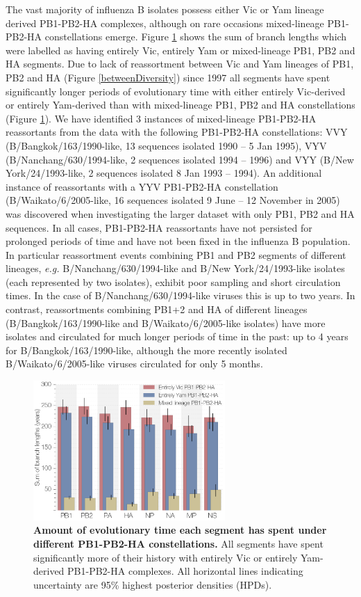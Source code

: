 \documentclass[11pt,oneside,letterpaper]{article}
\begin{document}
The vast majority of influenza B isolates possess either Vic or Yam lineage derived PB1-PB2-HA complexes, although on rare occasions mixed-lineage PB1-PB2-HA constellations emerge.
Figure \ref{stateTime} shows the sum of branch lengths which were labelled as having entirely Vic, entirely Yam or mixed-lineage PB1, PB2 and HA segments.
Due to lack of reassortment between Vic and Yam lineages of PB1, PB2 and HA (Figure \ref{betweenDiversity}) since 1997 all segments have spent significantly longer periods of evolutionary time with either entirely Vic-derived or entirely Yam-derived than with mixed-lineage PB1, PB2 and HA constellations (Figure \ref{stateTime}).
We have identified 3 instances of mixed-lineage PB1-PB2-HA reassortants from the data with the following PB1-PB2-HA constellations: VVY (B/Bangkok/163/1990-like, 13 sequences isolated 1990 -- 5 Jan 1995), VYV (B/Nanchang/630/1994-like, 2 sequences isolated 1994 -- 1996) and VYY (B/New York/24/1993-like, 2 sequences isolated 8 Jan 1993 -- 1994).
An additional instance of reassortants with a YYV PB1-PB2-HA constellation (B/Waikato/6/2005-like, 16 sequences isolated 9 June -- 12 November in 2005) was discovered when investigating the larger dataset with only PB1, PB2 and HA sequences.
In all cases, PB1-PB2-HA reassortants have not persisted for prolonged periods of time and have not been fixed in the influenza B population.
In particular reassortment events combining PB1 and PB2 segments of different lineages, \textit{e.g.} B/Nanchang/630/1994-like and B/New York/24/1993-like isolates (each represented by two isolates), exhibit poor sampling and short circulation times.
In the case of B/Nanchang/630/1994-like viruses this is up to two years.
In contrast, reassortments combining PB1+2 and HA of different lineages (B/Bangkok/163/1990-like and B/Waikato/6/2005-like isolates) have more isolates and circulated for much longer periods of time in the past: up to 4 years for B/Bangkok/163/1990-like, although the more recently isolated B/Waikato/6/2005-like viruses circulated for only 5 months.

\begin{figure}[h]
	\centering		
	\includegraphics[width=0.65\textwidth]{figures/InfB_stateTime.png}
	\caption{\textbf{Amount of evolutionary time each segment has spent under different PB1-PB2-HA constellations.}
All segments have spent significantly more of their history with entirely Vic or entirely Yam-derived PB1-PB2-HA complexes.
All horizontal lines indicating uncertainty are 95\% highest posterior densities (HPDs).}
	\label{stateTime}
\end{figure}
\end{document}
